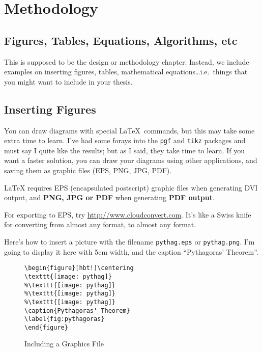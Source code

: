 \chapter{Methodology}\label{chap:methodology}

\section{Figures, Tables, Equations, Algorithms, etc}

This is supposed to be the design or methodology chapter.  Instead, we include examples on inserting figures, tables, mathematical equations\ldots i.e.\ things that you might want to include in your thesis.

\section{Inserting Figures}\label{sec:figure}

You can draw diagrams with special \LaTeX\ commands, but this may take some extra time to learn.  I've had some forays into the \texttt{pgf} and \texttt{tikz} packages and must say I quite like the results; but as I said, they take time to learn. If you want a faster solution, you can draw your diagrams using other applications, and saving them as graphic files (EPS, PNG, JPG, PDF).  

\LaTeX{} requires EPS (encapsulated postscript) graphic files when generating DVI output, and \textbf{PNG, JPG or PDF} when generating \textbf{PDF output}.

For exporting to EPS, try \url{http://www.cloudconvert.com}. It's like a Swiss knife for converting from almost any format, to almost any format.

Here's how to insert a picture with the filename \verb|pythag.eps| or \verb|pythag.png|.  I'm going to display it here with 5cm width, and the caption ``Pythagoras' Theorem''.

\begin{figure}[hbt!]
\begin{lstlisting}
\begin{figure}[hbt!]\centering
\texttt{[image: pythag]}
%\texttt{[image: pythag]}
%\texttt{[image: pythag]}
%\texttt{[image: pythag]}
\caption{Pythagoras' Theorem}
\label{fig:pythagoras}
\end{figure}
\end{lstlisting}
\caption{Including a Graphics File}\label{fig:lst:graphics}
\end{figure}

